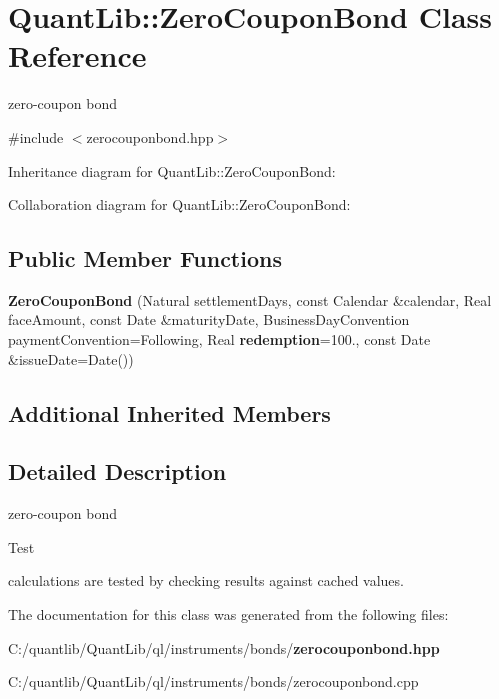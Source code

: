 \section{Quant\+Lib\+:\+:Zero\+Coupon\+Bond Class Reference}
\label{class_quant_lib_1_1_zero_coupon_bond}


zero-\/coupon bond  




{\ttfamily \#include $<$zerocouponbond.\+hpp$>$}



Inheritance diagram for Quant\+Lib\+:\+:Zero\+Coupon\+Bond\+:


Collaboration diagram for Quant\+Lib\+:\+:Zero\+Coupon\+Bond\+:
\subsection*{Public Member Functions}
\begin{DoxyCompactItemize}
\item 
{\bfseries Zero\+Coupon\+Bond} (Natural settlement\+Days, const Calendar \&calendar, Real face\+Amount, const Date \&maturity\+Date, Business\+Day\+Convention payment\+Convention=Following, Real {\bf redemption}=100., const Date \&issue\+Date=Date())\label{class_quant_lib_1_1_zero_coupon_bond_a1deaa224f0c5e1c163cbc214961d99d4}

\end{DoxyCompactItemize}
\subsection*{Additional Inherited Members}


\subsection{Detailed Description}
zero-\/coupon bond 

\begin{DoxyRefDesc}{Test}
\item[{\bf Test}]calculations are tested by checking results against cached values. \end{DoxyRefDesc}


The documentation for this class was generated from the following files\+:\begin{DoxyCompactItemize}
\item 
C\+:/quantlib/\+Quant\+Lib/ql/instruments/bonds/{\bf zerocouponbond.\+hpp}\item 
C\+:/quantlib/\+Quant\+Lib/ql/instruments/bonds/zerocouponbond.\+cpp\end{DoxyCompactItemize}
